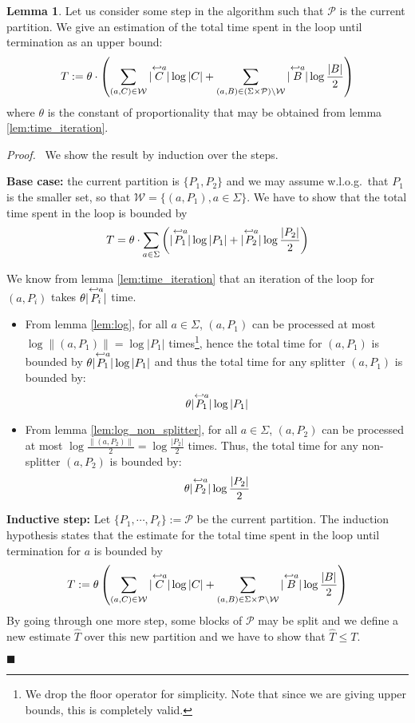 \documentclass[12pt, a4 paper]{article}
\renewenvironment{proof}[1][Proof]{\begin{mdframed}[backgroundcolor=black!5, topline=false, rightline=false, bottomline=false, linecolor=black!15, linewidth=3pt]{\noindent\textit{#1.}\ }}{\noindent\par\hfill$\blacksquare$\end{mdframed}}
\theoremstyle{definition}
\newtheorem{lemma}{Lemma}
\begin{document}
\begin{lemma}\label{lem:bound}
    Let us consider some step in the algorithm such that $\mathcal{P}$ is the current partition. We give an estimation of the total time spent in the loop until termination as an upper bound:
    $$ T := \theta \cdot \left(\sum_{(a, C) \in \mathcal{W}} | \overset{\hookleftarrow {a}}{C} | \log | C | + \sum_{(a, B) \in (\Sigma\times \mathcal{P})\setminus \mathcal{W}} | \overset{\hookleftarrow {a}}{B} | \log \frac{| B |}{2} \right)$$
    where $\theta$ is the constant of proportionality that may be obtained from lemma \ref{lem:time_iteration}.
\end{lemma}
\begin{proof}
    We show the result by induction over the steps.

    \bigskip
    \textbf{Base case:} the current partition is $\{P_1, P_2\}$ and we may assume w.l.o.g.\ that $P_1$ is the smaller set, so that $\mathcal{W} = \{(a, P_1), a \in \Sigma\}$.
    We have to show that the total time spent in the loop is bounded by
    $$T = \theta \cdot \sum_{a \in \Sigma} \left(| \overset{\hookleftarrow {a}}{P_1} | \log | P_1 | + | \overset{\hookleftarrow {a}}{P_2} | \log \frac{| P_2 |}{2}\right)$$
    
    We know from lemma \ref{lem:time_iteration} that an iteration of the loop for $(a, P_i)$ takes $\theta | \overset{\hookleftarrow {a}}{P_i} | $ time.
    \begin{itemize}
        \item From lemma \ref{lem:log}, for all $a\in\Sigma$, $(a, P_1)$ can be processed at most $\log \| (a, P_1) \| = \log |P_1|$ times\footnote{We drop the floor operator for simplicity.
        Note that since we are giving upper bounds, this is completely valid.}, hence the total time for $(a, P_1)$ is bounded by $\theta | \overset{\hookleftarrow {a}}{P_1} | \log | P_1 |$ and thus the total time for any splitter $(a, P_1)$ is bounded by:
        $$\theta | \overset{\hookleftarrow {a}}{P_1} | \log | P_1 |$$

        \item From lemma \ref{lem:log_non_splitter}, for all $a\in\Sigma$, $(a, P_2)$ can be processed at most $\log \frac{\| (a, P_2) \|}{2} = \log \frac{| P_2 |}{2}$ times. Thus, the total time for any non-splitter $(a, P_2)$ is bounded by:
        $$ \theta | \overset{\hookleftarrow {a}}{P_2} | \log \frac{| P_2 |}{2}$$
    \end{itemize}
    
    \textbf{Inductive step:} Let $\{P_1, \cdots, P_\ell\} := \mathcal{P}$ be the current partition.
    The induction hypothesis states that the estimate for the total time spent in the loop until termination for $a$ is bounded by
    $$ T := \theta \left(\sum_{(a, C) \in \mathcal{W}} | \overset{\hookleftarrow {a}}{C} | \log | C | + \sum_{(a, B) \in \Sigma\times \mathcal{P}\setminus \mathcal{W}} | \overset{\hookleftarrow {a}}{B} | \log \frac{| B |}{2} \right)$$
    By going through one more step, some blocks of $\mathcal{P}$ may be split and we define a new estimate $\hat{T}$ over this new partition and we have to show that $\hat{T} \leq T$.


\end{proof}
\end{document}
